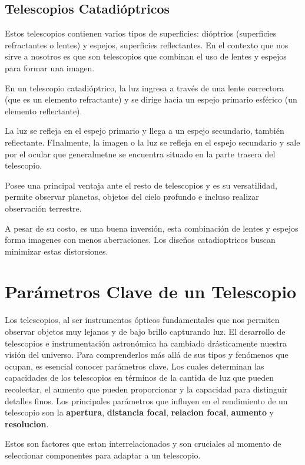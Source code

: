 \subsection{Telescopios Catadióptricos}

Estos telescopios contienen varios tipos de superficies: dióptrios (superficies refractantes o lentes) y espejos, superficies reflectantes. En el contexto que nos sirve a nosotros es que son telescopios que combinan el uso de lentes y espejos para formar una imagen. 

En un telescopio catadióptrico, la luz ingresa a través de una lente correctora (que es un elemento refractante) y se dirige hacia un espejo primario esférico (un elemento reflectante).

La luz se refleja en el espejo primario y llega a un espejo secundario, también reflectante. FInalmente, la imagen o la luz se refleja en el espejo secundario y sale por el ocular que generalmetne se encuentra situado en la parte trasera del telescopio. 

Posee una principal ventaja ante el resto de telescopios y es su versatilidad, permite observar planetas, objetos del cielo profundo e incluso realizar observación terrestre. 

A pesar de su costo, es una buena inversión, esta combinación de lentes y espejos forma imagenes con menos aberraciones. Los diseños catadioptricos buscan minimizar estas distorsiones.




\section{Parámetros Clave de un Telescopio}

Los telescopios, al ser instrumentos ópticos fundamentales que nos permiten observar objetos muy lejanos y de bajo brillo capturando luz. El desarrollo de telescopios e instrumentación astronómica ha cambiado drásticamente nuestra visión del universo. Para comprenderlos más allá de sus tipos y fenómenos que ocupan, es esencial conocer parámetros clave. Los cuales determinan las capacidades de los telescopios en términos de la cantida de luz que pueden recolectar, el aumento que pueden proporcionar y la capacidad para distinguir detalles finos. Los principales parámetros que influyen en el rendimiento de un telescopio son la \textbf{apertura}, \textbf{distancia focal}, \textbf{relacion focal}, \textbf{aumento} y \textbf{resolucion}. 

Estos son factores que estan interrelacionados y son cruciales al momento de seleccionar componentes para adaptar a un telescopio.

